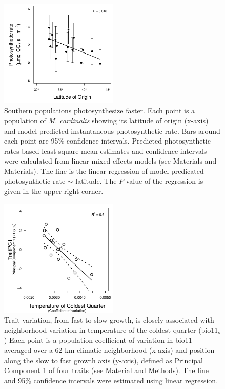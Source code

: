 \documentclass[11pt, oneside]{article}
\begin{document}
\begin{figure}[h!]
	\centerline{\includegraphics[width=0.5\textwidth]{Figures/FigureS_Photolat.pdf}}
	\fontsize{10}{12}
	\selectfont
	\caption[Southern populations photosynthesize faster.]{Southern populations photosynthesize faster. Each point is a population of \textit{M. cardinalis} showing its latitude of origin (x-axis) and model-predicted instantaneous photosynthetic rate. Bars around each point are 95\% confidence intervals. Predicted photosynthetic rates based least-square mean estimates and confidence intervals were calculated from linear mixed-effects models (see Materials and Materials). The line is the linear regression of model-predicated photosynthetic rate $\sim$ latitude. The $P$-value of the regression is given in the upper right corner.}
	\label{fig:FigS_Photolat}
\end{figure}


\begin{figure}[h!]
\centerline{\includegraphics[width=0.5\textwidth]{Figures/FigureS_bio11PC1.pdf}}
\fontsize{10}{12}
\selectfont
\caption[Trait PC1 versus bio11_cva_SA]{Trait variation, from fast to slow growth, is closely associated with neighborhood variation in temperature of the coldest quarter (bio11$_\sigma$) Each point is a population coefficient of variation in bio11 averaged over a 62-km climatic neighborhood  (x-axis) and position along the slow to fast growth axis (y-axis), defined as Principal Component 1 of four traits (see Material and Methods). The line and 95\% confidence intervals were estimated using linear regression.}
\label{fig:FigS_bio11PC1}
\end{figure}
\end{document}
